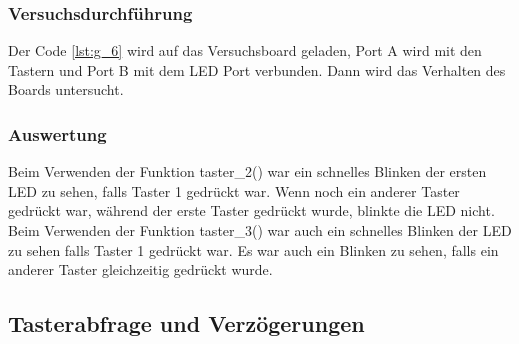 \documentclass[12pt,a4paper]{article}
\begin{document}
\subsubsection*{Versuchsdurchführung}

Der Code \ref{lst:g_6} wird auf das Versuchsboard geladen, Port A wird mit den Tastern und Port B mit dem LED Port verbunden. Dann wird das Verhalten des Boards untersucht.

\subsubsection*{Auswertung}

Beim Verwenden der Funktion taster\_2() war ein schnelles Blinken der ersten LED zu sehen, falls Taster 1 gedrückt war. Wenn noch ein anderer Taster gedrückt war, während der erste Taster gedrückt wurde, blinkte die LED nicht. Beim Verwenden der Funktion taster\_3() war auch ein schnelles Blinken der LED zu sehen falls Taster 1 gedrückt war. Es war auch ein Blinken zu sehen, falls ein anderer Taster gleichzeitig gedrückt wurde.

\subsection{Tasterabfrage und Verzögerungen}
\end{document}
